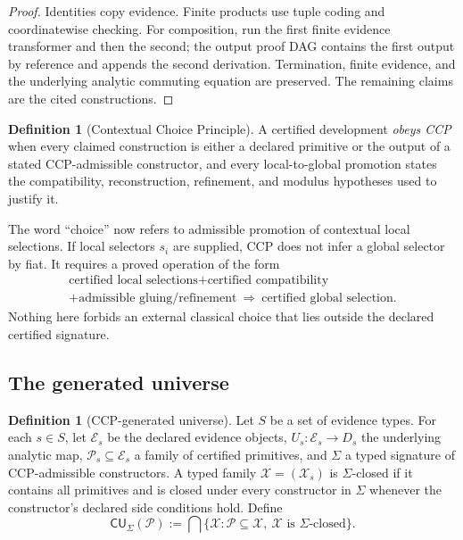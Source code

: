 \documentclass[11pt]{article}
\theoremstyle{definition}
\newtheorem{definition}[theorem]{Definition}
\begin{document}
\begin{proof}
Identities copy evidence.  Finite products use tuple coding and coordinatewise checking.
For composition, run the first finite evidence transformer and then the second; the output
proof DAG contains the first output by reference and appends the second derivation.
Termination, finite evidence, and the underlying analytic commuting equation are
preserved.  The remaining claims are the cited constructions.
\end{proof}

\begin{definition}[Contextual Choice Principle]\label{def:ccp}
A certified development \emph{obeys CCP} when every claimed construction is either a
declared primitive or the output of a stated CCP-admissible constructor, and every
local-to-global promotion states the compatibility, reconstruction, refinement, and
modulus hypotheses used to justify it.
\end{definition}

The word ``choice'' now refers to admissible promotion of contextual local selections.  If
local selectors $s_i$ are supplied, CCP does not infer a global selector by fiat.  It
requires a proved operation of the form
\[
\begin{gathered}
 \text{certified local selections}+\text{certified compatibility}\\
 +\text{admissible gluing/refinement}
 \ \Longrightarrow\ 
 \text{certified global selection}.
\end{gathered}
\]
Nothing here forbids an external classical choice that lies outside the declared certified
signature.

\subsection{The generated universe}

\begin{definition}[CCP-generated universe]\label{def:generated}
Let $S$ be a set of evidence types.  For each $s\in S$, let $\mathcal E_s$ be the declared
evidence objects, $U_s:\mathcal E_s\to D_s$ the underlying analytic map,
$\mathcal P_s\subseteq\mathcal E_s$ a family of certified primitives, and $\Sigma$ a typed
signature of CCP-admissible constructors.  A typed family $\mathcal X=(\mathcal X_s)$ is
$\Sigma$-closed if it contains all primitives and is closed under every constructor in
$\Sigma$ whenever the constructor's declared side conditions hold.  Define
\[
 \mathsf{CU}_\Sigma(\mathcal P)
 :=\bigcap\{\mathcal X:\mathcal P\subseteq\mathcal X,
                 \ \mathcal X\text{ is }\Sigma\text{-closed}\}.
\]
\end{definition}
\end{document}
